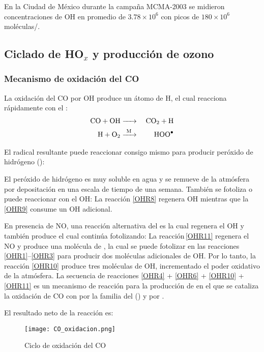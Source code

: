 En la Ciudad de México durante la campaña MCMA-2003 se midieron concentraciones de OH en promedio de  $3.78\times10^6$ con picos de $180\times10^6$ moléculas/\centi\cubic\metre.

\subsection{Ciclado de HO$_x$ y producci\'on de ozono}
\subsubsection{Mecanismo de oxidaci\'on del CO}\label{ciclado}

La oxidación del CO por OH produce un átomo de H, el cual reacciona rápidamente con el :
\begin{eqnarray}
\ce{CO + OH & -> &CO2 + H} \label{OHR4}  \\
\ce{H + O2  & ->[M]  & HOO^.}  \label{OHR6} 
\end{eqnarray}

El radical resultante  puede reaccionar consigo mismo para producir peróxido de hidrógeno ():


El peróxido de hidrógeno es muy soluble en agua y se remueve de la atmósfera por depositación en una escala de tiempo de una semana. También  se  fotoliza o puede  reaccionar con el OH:
La reacción \ref{OHR8} regenera OH mientras que la \ref{OHR9} consume un OH adicional.

En presencia de NO, una reacción alternativa del  es
la cual regenera el OH y también produce  el cual continúa fotolizando:
La reacción\,\ref{OHR11} regenera el NO y produce una molécula de , la cual se puede fotolizar en las reacciones \ref{OHR1}--\ref{OHR3} para producir dos moléculas adicionales de OH. Por lo tanto, la reacción \ref{OHR10} produce tres moléculas de OH, incrementado el poder oxidativo de la atmósfera. La secuencia de reacciones \ref{OHR4} + \ref{OHR6} + \ref{OHR10} + \ref{OHR11} es un mecanismo de reacción para la producción de  en el que se cataliza la oxidación de CO con  por la familia del   ()  y por .

El resultado neto de la reacción es:
\begin{figure}[htbp]
\begin{center}
\texttt{[image: CO\_oxidacion.png]}
\caption{Ciclo de oxidación del CO}
\label{CO_ox}
\end{center}
\end{figure}

